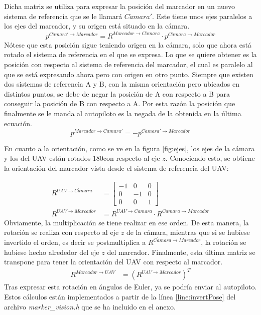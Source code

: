 \begin{enumerate}
Dicha matriz se utiliza para expresar la posición del marcador en un nuevo sistema de referencia que se le llamará $C\acute{a}mara'$. Este tiene unos ejes paralelos a los ejes del marcador, y su origen está situado en la cámara. 
	\begin{equation}
	p^{C\acute{a}mara' \rightarrow Marcador} = R^{Marcador \rightarrow C\acute{a}mara} \cdot p^{C\acute{a}mara \rightarrow Marcador}
	\end{equation}
Nótese que esta posición sigue teniendo origen en la cámara, solo que ahora está rotado el sistema de referencia en el que se expresa. Lo que se quiere obtener es la posición con respecto al sistema de referencia del marcador, el cual es paralelo al que se está expresando ahora pero con origen en otro punto. Siempre que existen dos sistemas de referencia A y B, con la misma orientación pero ubicados en distintos puntos, se debe de negar la posición de A con respecto a B para conseguir la posición de B con respecto a A. Por esta razón la posición que finalmente se le manda al autopiloto es la negada de la obtenida en la última ecuación.   
	\begin{equation}
	p^{Marcador \rightarrow C\acute{a}mara' } = - p^{C\acute{a}mara' \rightarrow Marcador}
	\end{equation}

 En cuanto a la orientación, como se ve en la figura \ref{fig:ejes}, los ejes de la cámara y los del UAV están rotados 180\textdegree con respecto al eje $z$. Conociendo esto, se obtiene la orientación del marcador vista desde el sistema de referencia del UAV:

	\begin{align}
	R^{UAV\rightarrow C\acute{a}mara}& = \begin{bmatrix} -1 & 0 & 0\\ 0 & -1 & 0 \\ 0 & 0 & 1 \end{bmatrix}\\
	R^{UAV \rightarrow Marcador}& = R^{UAV\rightarrow C\acute{a}mara}\cdot R^{C\acute{a}mara\rightarrow Marcador}
	\end{align}
Obviamente, la multiplicación se tiene realizar en ese orden. De esta manera, la rotación se realiza con respecto al eje $z$ de la cámara, mientras que si se hubiese invertido el orden, es decir se postmultiplica a $R^{C\acute{a}mara\rightarrow Marcador}$, la rotación se hubiese hecho alrededor del eje $z$ del marcador.
	Finalmente, esta última matriz se transpone para tener la orientación del UAV con respecto al marcador.
	\begin{align}
	R^{Marcador \rightarrow UAV}& = \left(R^{UAV \rightarrow Marcador}\right)^T
	\end{align}
	Tras expresar esta rotación en ángulos de Euler, ya se podría enviar al autopiloto.
	Estos cálculos están implementados a partir de la línea \ref{line:invertPose} del archivo \textit{marker\_vision.h} que se ha incluido en el anexo.



\end{enumerate}
